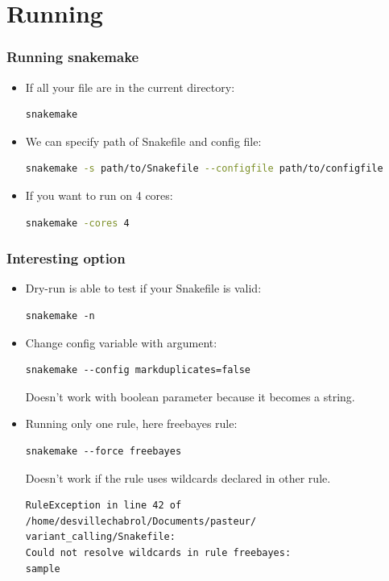 \documentclass{beamer}
\begin{document}
\section{Running}

\begin{frame}[fragile]
    \frametitle{Running snakemake}
    \begin{itemize}
        \item If all your file are in the current directory:
            \begin{lstlisting}[language=bash]
    snakemake
            \end{lstlisting}
        \item We can specify path of Snakefile and config file:
            \begin{lstlisting}[language=bash]
    snakemake -s path/to/Snakefile --configfile path/to/configfile
            \end{lstlisting}
        \item If you want to run on 4 cores:
            \begin{lstlisting}[language=bash]
    snakemake -cores 4
            \end{lstlisting}
    \end{itemize}
\end{frame}

\begin{frame}[fragile]
    \frametitle{Interesting option}
    \begin{itemize}
        \item Dry-run is able to test if your Snakefile is valid:
        \begin{lstlisting}[language={}]
    snakemake -n
        \end{lstlisting}
        \item Change config variable with argument:
        \begin{lstlisting}[language={}]
    snakemake --config markduplicates=false
        \end{lstlisting}
        \begin{alertblock}{}
            Doesn't work with boolean parameter because it becomes a string. 
        \end{alertblock}
        \item Running only one rule, here freebayes rule:
        \begin{lstlisting}[language={}]
    snakemake --force freebayes
        \end{lstlisting}
        \begin{alertblock}{}
            Doesn't work if the rule uses wildcards declared in other rule.
            \begin{lstlisting}[language={}]
RuleException in line 42 of /home/desvillechabrol/Documents/pasteur/
variant_calling/Snakefile:
Could not resolve wildcards in rule freebayes:
sample
        \end{lstlisting}
        \end{alertblock}
    \end{itemize}
\end{frame}
\end{document}
